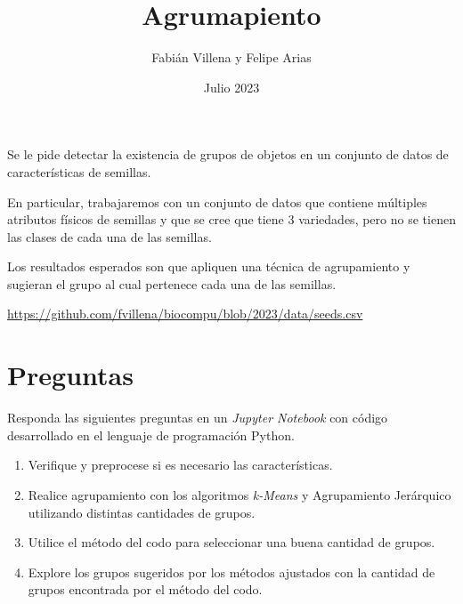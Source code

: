 \documentclass{article}
\title{Agrumapiento}
\author{Fabián Villena y Felipe Arias}
\date{Julio 2023}
\begin{document}
\maketitle

Se le pide detectar la existencia de grupos de objetos en un conjunto de datos de características de semillas.

En particular, trabajaremos con un conjunto de datos que contiene múltiples atributos físicos de semillas y que se cree que tiene 3 variedades, pero no se tienen las clases de cada una de las semillas.

Los resultados esperados son que apliquen una técnica de agrupamiento y sugieran el grupo al cual pertenece cada una de las semillas. 

\begin{center}
    \url{https://github.com/fvillena/biocompu/blob/2023/data/seeds.csv}
\end{center}

\section*{Preguntas}

Responda las siguientes preguntas en un \textit{Jupyter Notebook} con código desarrollado en el lenguaje de programación Python.

\begin{enumerate}
	\item Verifique y preprocese si es necesario las características.
    \item Realice agrupamiento con los algoritmos \textit{k-Means} y Agrupamiento Jerárquico utilizando distintas cantidades de grupos.
    \item Utilice el método del codo para seleccionar una buena cantidad de grupos.
    \item Explore los grupos sugeridos por los métodos ajustados con la cantidad de grupos encontrada por el método del codo.
\end{enumerate}
\end{document}
